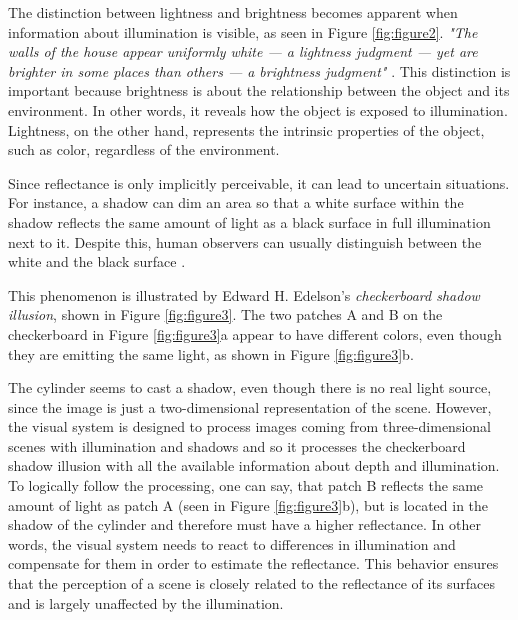 The distinction between lightness and brightness becomes apparent when information about
illumination is visible, as seen in Figure \ref*{fig:figure2}. \emph{"The walls of the
house appear uniformly white — a lightness judgment — yet are brighter in some places than
others — a brightness judgment"} \parencite{Kingdom2014}. This distinction is important
because brightness is about the relationship between the object and its environment. In
other words, it reveals how the object is exposed to illumination. Lightness, on the other
hand, represents the intrinsic properties of the object, such as color, regardless of the
environment.

Since reflectance is only implicitly perceivable, it can lead to uncertain situations. For
instance, a shadow can dim an area so that a white surface within the shadow reflects the
same amount of light as a black surface in full illumination next to it. Despite this,
human observers can usually distinguish between the white and the black surface
\parencite{arend1993}. 

This phenomenon is illustrated by Edward H. Edelson's \emph{checkerboard shadow illusion},
shown in Figure \ref*{fig:figure3}. The two patches A and B on the checkerboard in Figure
\ref*{fig:figure3}a appear to have different colors, even though they are emitting the
same light, as shown in Figure \ref*{fig:figure3}b.

The cylinder seems to cast a shadow, even though there is no real light source, since the
image is just a two-dimensional representation of the scene. However, the visual system is
designed to process images coming from three-dimensional scenes with illumination and
shadows and so it processes the checkerboard shadow illusion with all the available
information about depth and illumination. To logically follow the processing, one can say,
that patch B reflects the same amount of light as patch A (seen in Figure
\ref*{fig:figure3}b), but is located in the shadow of the cylinder and therefore must have
a higher reflectance. In other words, the visual system needs to react to differences in
illumination and compensate for them in order to estimate the reflectance. This behavior
ensures that the perception of a scene is closely related to the reflectance of its
surfaces and is largely unaffected by the illumination. 

